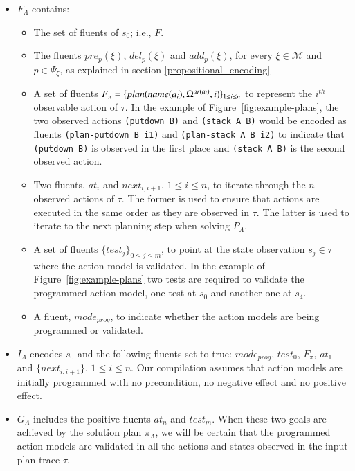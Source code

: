 \begin{itemize}

\item $F_{\Lambda}$ contains:
\begin{itemize}
\item The set of fluents of $s_0$; i.e., $F$.
\item The fluents $pre_p(\xi)$, $del_p(\xi)$ and $add_p(\xi)$, for every $\xi \in \mathcal{M}$ and $p\in \Psi_{\xi}$, as explained in section \ref{propositional_encoding}
\item A set of fluents $F_{\pi}=\{plan(name(a_i),\Omega^{ar(a_i)},i)\}_{\small 1\leq i\leq n}$ to represent the $i^{th}$ observable action of $\tau$. In the example of Figure~\ref{fig:example-plans}, the two observed actions {\small \texttt{(putdown B)}} and {\small \texttt{(stack  A  B)}} would be encoded as fluents  {\small \texttt{(plan-putdown B i1)}} and {\small \texttt{(plan-stack A B i2)}} to indicate that {\small \texttt{(putdown B)}} is observed in the first place and {\small \texttt{(stack  A  B)}} is the second observed action.
\item Two fluents, $at_i$ and $next_{i,i+1}$, {\small $1\leq i \leq n$}, to iterate through the $n$ observed actions of $\tau$. The former is used to ensure that actions are executed in the same order as they are observed in $\tau$. The latter is used to iterate to the next planning step when solving $P_{\Lambda}$.
\item A set of fluents $\{test_j\}_{0\leq j\leq m}$, to point at the state observation $s_j\in\tau$ where the action model is
validated. In the example of Figure~\ref{fig:example-plans} two tests are required to validate the programmed action model, one test at $s_0$ and another one at $s_4$.
\item A fluent, $mode_{prog}$, to indicate whether the action models are being programmed or validated.
\end{itemize}

\item $I_{\Lambda}$ encodes $s_0$ and the following fluents set to true: $mode_{prog}$, $test_0$, $F_{\pi}$, $at_1$ and $\{next_{i,i+1}\}$, {\small $1\leq i \leq n$}. Our compilation assumes that action models are initially programmed with no precondition, no negative effect and no positive effect.

\item $G_{\Lambda}$ includes the positive fluents $at_n$ and $test_m$. When these two goals are achieved by the solution plan $\pi_\Lambda$, we will be certain that the programmed action models are validated in all the actions and states observed in the input plan trace $\tau$.


\end{itemize}
